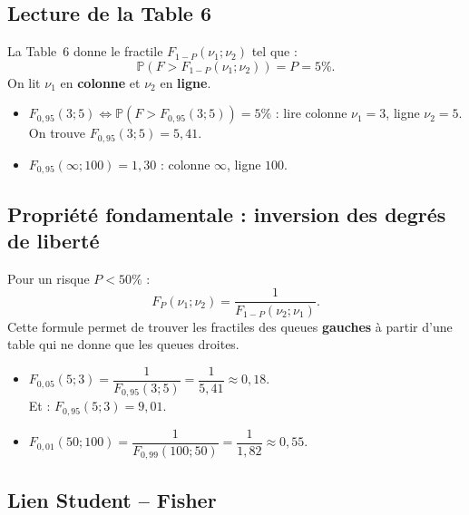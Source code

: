 \documentclass[11pt,a4paper]{article}
\newcommand{\Prob}{\mathbb{P}}
\renewcommand{\P}{\Prob}
\begin{document}
\subsection{Lecture de la Table 6}

\begin{defbox}
La Table~6 donne le fractile $F_{1-P}(\nu_1;\nu_2)$ tel que :
$$\P\!\left(F > F_{1-P}(\nu_1;\nu_2)\right) = P = 5\%.$$
On lit $\nu_1$ en \textbf{colonne} et $\nu_2$ en \textbf{ligne}.
\end{defbox}

\begin{exbox}
\begin{itemize}
\item $F_{0{,}95}(3;5) \Leftrightarrow \P(F > F_{0{,}95}(3;5)) = 5\%$ : lire colonne $\nu_1=3$, ligne $\nu_2=5$.\\
On trouve $F_{0{,}95}(3;5) = 5{,}41$.
\item $F_{0{,}95}(\infty;100) = 1{,}30$ : colonne $\infty$, ligne $100$.
\end{itemize}
\end{exbox}

\subsection{Propri\'et\'e fondamentale : inversion des degr\'es de libert\'e}

\begin{thmbox}
Pour un risque $P < 50\%$ :
$$\boxed{F_P(\nu_1;\nu_2) = \frac{1}{F_{1-P}(\nu_2;\nu_1)}.}$$
Cette formule permet de trouver les fractiles des queues \textbf{gauches} \`a partir d'une table qui ne donne que les queues droites.
\end{thmbox}

\begin{exbox}[Exemples]
\begin{itemize}
\item $F_{0{,}05}(5;3) = \dfrac{1}{F_{0{,}95}(3;5)} = \dfrac{1}{5{,}41} \approx 0{,}18$.\\ Et : $F_{0{,}95}(5;3) = 9{,}01$.
\item $F_{0{,}01}(50;100) = \dfrac{1}{F_{0{,}99}(100;50)} = \dfrac{1}{1{,}82} \approx 0{,}55$.
\end{itemize}
\end{exbox}

\subsection{Lien Student -- Fisher}
\end{document}
